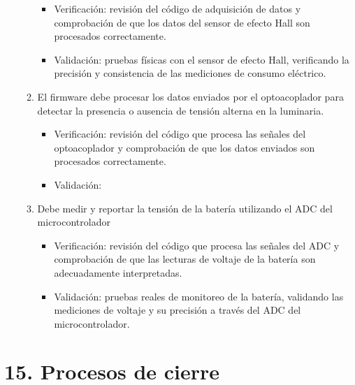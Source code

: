 \documentclass[
11pt, %
]{charter}
\begin{document}
\begin{enumerate}
\begin{enumerate}
\begin{itemize}
				\item Verificación: revisión del código de adquisición de datos y comprobación de que los datos del sensor de efecto Hall son procesados correctamente.
				\item Validación: pruebas físicas con el sensor de efecto Hall, verificando la precisión y consistencia de las mediciones de consumo eléctrico.
				\end{itemize}
			\item El firmware debe procesar los datos enviados por el optoacoplador para detectar la presencia o ausencia de tensión alterna en la luminaria.
				\begin{itemize}
				\item Verificación: revisión del código que procesa las señales del optoacoplador y comprobación de que los datos enviados son procesados correctamente.
				\item Validación:
				\end{itemize}
			\item Debe medir y reportar la tensión de la batería utilizando el ADC del microcontrolador
				\begin{itemize}
				\item Verificación: revisión del código que procesa las señales del ADC y comprobación de que las lecturas de voltaje de la batería son adecuadamente 	interpretadas.
				\item Validación: pruebas reales de monitoreo de la batería, validando las mediciones de voltaje y su precisión a través del ADC del microcontrolador.
				\end{itemize}
		\end{enumerate}
\end{enumerate}

\section{15. Procesos de cierre}    
\label{sec:cierre}
\end{document}
